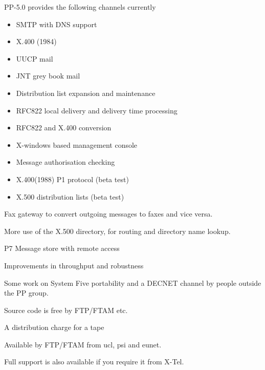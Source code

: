 \begin{bwslide}
\begin{nrtc}
\item PP-5.0 provides the following channels currently

	\begin{itemize}
	\item SMTP with DNS support
	\item X.400 (1984)
	\item UUCP mail
	\item JNT grey book mail
	\item Distribution list expansion and maintenance
	\item RFC822 local delivery and delivery time processing
	\item RFC822 and X.400 conversion
	\item X-windows based management console
	\item Message authorisation checking
	\item X.400(1988) P1 protocol (beta test)
	\item X.500 distribution lists (beta test)
	\end{itemize}

\end{nrtc}
\end{bwslide}

\begin{bwslide}
\begin{nrtc}
\item	Fax gateway to convert outgoing messages to faxes and vice
versa.

\item	More use of the X.500 directory, for routing and directory
name lookup.

\item	P7 Message store with remote access

\item	Improvements in throughput and robustness

\item	Some work on System Five portability and a DECNET channel by
people outside the PP group. 
\end{nrtc}
\end{bwslide}

\begin{bwslide}
\begin{nrtc}
\item	Source code is free by FTP/FTAM etc.
\item	A distribution charge for a tape

\item	Available by FTP/FTAM from ucl, psi and eunet.

\item	Full support is also available if you require it from X-Tel.
\end{nrtc}
\end{bwslide}

